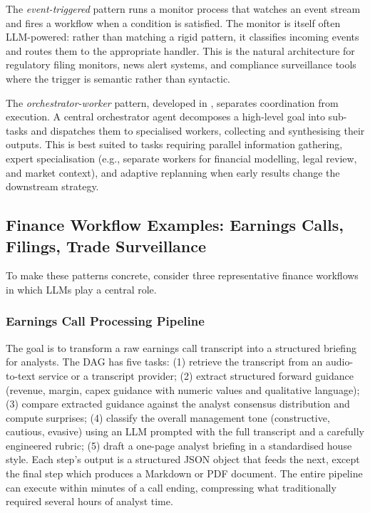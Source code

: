 \begin{context}
The \emph{event-triggered} pattern runs a monitor process that watches an event stream and fires a workflow when a condition is satisfied. The monitor is itself often LLM-powered: rather than matching a rigid pattern, it classifies incoming events and routes them to the appropriate handler. This is the natural architecture for regulatory filing monitors, news alert systems, and compliance surveillance tools where the trigger is semantic rather than syntactic.

The \emph{orchestrator-worker} pattern, developed in , separates coordination from execution. A central orchestrator agent decomposes a high-level goal into sub-tasks and dispatches them to specialised workers, collecting and synthesising their outputs. This is best suited to tasks requiring parallel information gathering, expert specialisation (e.g., separate workers for financial modelling, legal review, and market context), and adaptive replanning when early results change the downstream strategy.

\subsection{Finance Workflow Examples: Earnings Calls, Filings, Trade Surveillance}
\label{subsec:af-workflows-examples}

To make these patterns concrete, consider three representative finance workflows in which LLMs play a central role.

\subsubsection*{Earnings Call Processing Pipeline}
The goal is to transform a raw earnings call transcript into a structured briefing for analysts. The DAG has five tasks: (1) retrieve the transcript from an audio-to-text service or a transcript provider; (2) extract structured forward guidance (revenue, margin, capex guidance with numeric values and qualitative language); (3) compare extracted guidance against the analyst consensus distribution and compute surprises; (4) classify the overall management tone (constructive, cautious, evasive) using an LLM prompted with the full transcript and a carefully engineered rubric; (5) draft a one-page analyst briefing in a standardised house style. Each step's output is a structured JSON object that feeds the next, except the final step which produces a Markdown or PDF document. The entire pipeline can execute within minutes of a call ending, compressing what traditionally required several hours of analyst time.


\end{context}
